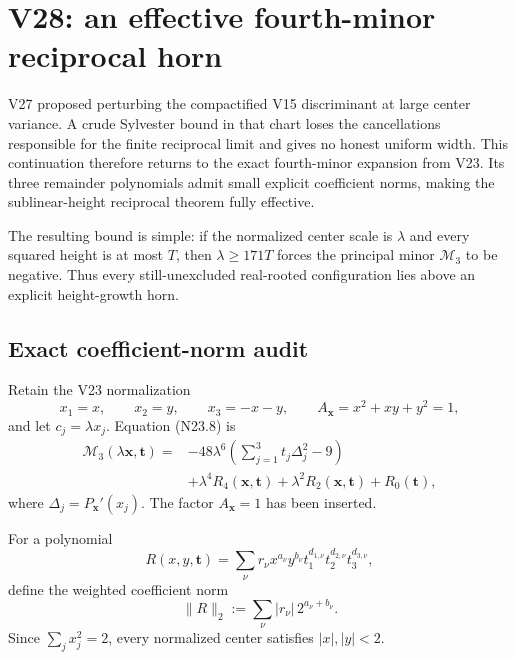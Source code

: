 \documentclass[11pt]{article}
\theoremstyle{definition}
\theoremstyle{remark}
\begin{document}


\section{V28: an effective fourth-minor reciprocal horn}
\label{sec:f2v28-effective-reciprocal}

V27 proposed perturbing the compactified V15 discriminant at large center
variance.  A crude Sylvester bound in that chart loses the cancellations
responsible for the finite reciprocal limit and gives no honest uniform
width.  This continuation therefore returns to the exact fourth-minor
expansion from V23.  Its three remainder polynomials admit small explicit
coefficient norms, making the sublinear-height reciprocal theorem fully
effective.

The resulting bound is simple: if the normalized center scale is
\(\lambda\) and every squared height is at most \(T\), then
\(\lambda\geq171T\) forces the principal minor \(\mathcal M_3\) to be
negative.  Thus every still-unexcluded real-rooted configuration lies
above an explicit height-growth horn.

\subsection{Exact coefficient-norm audit}
\label{subsec:f2v28-norm}

Retain the V23 normalization
\[
 x_1=x,\qquad x_2=y,\qquad x_3=-x-y,\qquad
 A_{\bm x}=x^2+xy+y^2=1,
 \tag{N28.1}
\]
and let \(c_j=\lambda x_j\).  Equation \textup{(N23.8)} is
\[
\begin{aligned}
 \mathcal M_3(\lambda\bm x,\bm t)
={}&-48\lambda^6
 \left(\sum_{j=1}^3t_j\Delta_j^2-9\right)\\
 &+\lambda^4R_4(\bm x,\bm t)
  +\lambda^2R_2(\bm x,\bm t)+R_0(\bm t),
\end{aligned}
\tag{N28.2}
\]
where \(\Delta_j=P_{\bm x}'(x_j)\).  The factor
\(A_{\bm x}=1\) has been inserted.

For a polynomial
\[
 R(x,y,\bm t)=
 \sum_{\nu}r_\nu x^{a_\nu}y^{b_\nu}
 t_1^{d_{1,\nu}}t_2^{d_{2,\nu}}t_3^{d_{3,\nu}},
 \tag{N28.3}
\]
define the weighted coefficient norm
\[
 \|R\|_{2}:=
 \sum_\nu |r_\nu|\,2^{a_\nu+b_\nu}.
 \tag{N28.4}
\]
Since \(\sum_jx_j^2=2\), every normalized center satisfies
\(|x|,|y|<2\).
\end{document}
